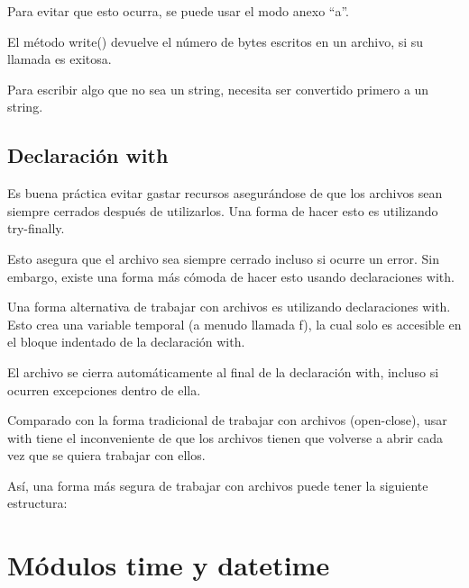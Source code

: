 \documentclass{report}
\newcommand{\doble}[1]{``#1''}
\begin{document}

Para evitar que esto ocurra, se puede usar el modo anexo \doble{a}.


El método write() devuelve el número de bytes escritos en un archivo, si su llamada es exitosa.


Para escribir algo que no sea un string, necesita ser convertido primero a un string.


\section{Declaración with}

Es buena práctica evitar gastar recursos asegurándose de que los archivos sean siempre cerrados después de utilizarlos. Una forma de hacer esto es utilizando try-finally.


Esto asegura que el archivo sea siempre cerrado incluso si ocurre un error.
Sin embargo, existe una forma más cómoda de hacer esto usando declaraciones with.\smallskip

Una forma alternativa de trabajar con archivos es utilizando declaraciones with. Esto crea una variable temporal (a menudo llamada f), la cual solo es accesible en el bloque indentado de la declaración with.


El archivo se cierra automáticamente al final de la declaración with, incluso si ocurren excepciones dentro de ella.\smallskip

Comparado con la forma tradicional de trabajar con archivos (open-close), usar with tiene el inconveniente de que los archivos tienen que volverse a abrir cada vez que se quiera trabajar con ellos.\smallskip

Así, una forma más segura de trabajar con archivos puede tener la siguiente estructura:


\clearpage\chapter{Módulos time y datetime}
\end{document}
